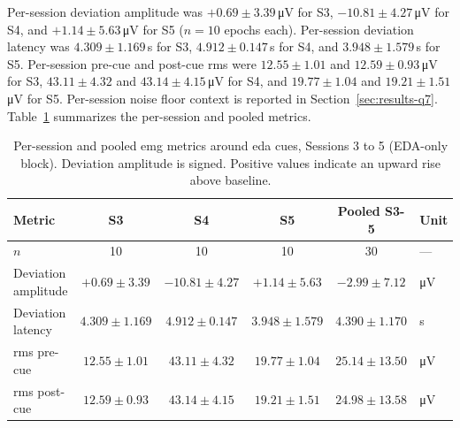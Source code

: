 Per-session deviation amplitude was $+\num{0.69} \pm \num{3.39}$\,\si{\micro\volt} for S3, $-\num{10.81} \pm \num{4.27}$\,\si{\micro\volt} for S4, and $+\num{1.14} \pm \num{5.63}$\,\si{\micro\volt} for S5 ($n = \num{10}$ epochs each). Per-session deviation latency was $\num{4.309} \pm \num{1.169}$\,\si{\second} for S3, $\num{4.912} \pm \num{0.147}$\,\si{\second} for S4, and $\num{3.948} \pm \num{1.579}$\,\si{\second} for S5. Per-session pre-cue and post-cue \gls{rms} were $\num{12.55} \pm \num{1.01}$ and $\num{12.59} \pm \num{0.93}$\,\si{\micro\volt} for S3, $\num{43.11} \pm \num{4.32}$ and $\num{43.14} \pm \num{4.15}$\,\si{\micro\volt} for S4, and $\num{19.77} \pm \num{1.04}$ and $\num{19.21} \pm \num{1.51}$\,\si{\micro\volt} for S5. Per-session noise floor context is reported in Section~\ref{sec:results-q7}. Table~\ref{tab:q6b-metrics} summarizes the per-session and pooled metrics.

\begin{table}[!htbp]
  \centering
  \caption{Per-session and pooled \gls{emg} metrics around \gls{eda} cues, Sessions 3 to 5 (EDA-only block). Deviation amplitude is signed. Positive values indicate an upward rise above baseline.}
  \label{tab:q6b-metrics}
  \begin{tabular}{l c c c c l}
    \toprule
    \textbf{Metric} & \textbf{S3} & \textbf{S4} & \textbf{S5} & \textbf{Pooled S3-5} & \textbf{Unit} \\
    \midrule
    $n$                  & \num{10} & \num{10} & \num{10} & \num{30} & --- \\
    Deviation amplitude  & $+\num{0.69}  \pm \num{3.39}$ & $-\num{10.81} \pm \num{4.27}$ & $+\num{1.14}  \pm \num{5.63}$ & $-\num{2.99} \pm \num{7.12}$ & \si{\micro\volt} \\
    Deviation latency    & $\num{4.309} \pm \num{1.169}$  & $\num{4.912} \pm \num{0.147}$  & $\num{3.948} \pm \num{1.579}$  & $\num{4.390} \pm \num{1.170}$  & \si{\second} \\
    \addlinespace
    \gls{rms} pre-cue    & $\num{12.55} \pm \num{1.01}$ & $\num{43.11} \pm \num{4.32}$ & $\num{19.77} \pm \num{1.04}$ & $\num{25.14} \pm \num{13.50}$ & \si{\micro\volt} \\
    \gls{rms} post-cue   & $\num{12.59} \pm \num{0.93}$ & $\num{43.14} \pm \num{4.15}$ & $\num{19.21} \pm \num{1.51}$ & $\num{24.98} \pm \num{13.58}$ & \si{\micro\volt} \\
    \bottomrule
  \end{tabular}
\end{table}


